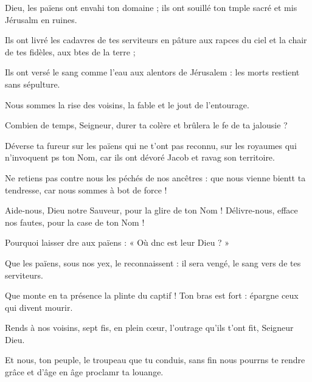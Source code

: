 \item Dieu, les païens ont envahi ton domaine ;\pscross{} ils ont souillé ton tmple sacré\psstar{} et mis Jérusalm en ruines.
\item Ils ont livré les cadavres de tes serviteurs en pâture aux rapces du ciel\psstar{} et la chair de tes fidèles, aux btes de la terre ;
\item Ils ont versé le sang comme l’eau aux alentors de Jérusalem :\psstar{} les morts restient sans sépulture.
\item Nous sommes la rise des voisins,\psstar{} la fable et le jout de l’entourage.
\item Combien de temps, Seigneur, durer ta colère\psstar{} et brûlera le fe de ta jalousie ?
\item Déverse ta fureur sur les païens qui ne t’ont pas reconnu,\pscross{} sur les royaumes qui n’invoquent ps ton Nom,\psstar{} car ils ont dévoré Jacob et ravag son territoire.
\item Ne retiens pas contre nous les péchés de nos ancêtres :\pscross{} que nous vienne bientt ta tendresse, car nous sommes à bot de force !
\item Aide-nous, Dieu notre Sauveur, pour la glire de ton Nom !\psstar{} Délivre-nous, efface nos fautes, pour la case de ton Nom !
\item Pourquoi laisser dre aux païens :\psstar{} « Où dnc est leur Dieu ? » 
\item Que les païens, sous nos yex, le reconnaissent :\psstar{} il sera vengé, le sang vers de tes serviteurs.
\item Que monte en ta présence la plinte du captif !\psstar{} Ton bras est fort : épargne ceux qui divent mourir.
\item Rends à nos voisins, sept fis, en plein cœur,\psstar{} l’outrage qu’ils t’ont fit, Seigneur Dieu.
\item Et nous, ton peuple, le troupeau que tu conduis,\pscross{} sans fin nous pourrns te rendre grâce\psstar{} et d’âge en âge proclamr ta louange.